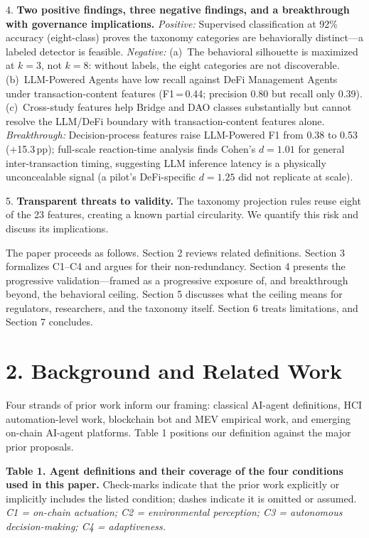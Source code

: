 \documentclass[sigconf,nonacm=false]{acmart}
\begin{document}
4. \textbf{Two positive findings, three negative findings, and a breakthrough with governance implications.} \textit{Positive:} Supervised classification at 92\% accuracy (eight-class) proves the taxonomy categories are behaviorally distinct---a labeled detector is feasible. \textit{Negative:} (a)~The behavioral silhouette is maximized at $k{=}3$, not $k{=}8$: without labels, the eight categories are not discoverable. (b)~LLM-Powered Agents have low recall against DeFi Management Agents under transaction-content features (F1\,=\,0.44; precision 0.80 but recall only 0.39). (c)~Cross-study features help Bridge and DAO classes substantially but cannot resolve the LLM/DeFi boundary with transaction-content features alone. \textit{Breakthrough:} Decision-process features raise LLM-Powered F1 from 0.38 to 0.53 ($+$15.3\,pp); full-scale reaction-time analysis finds Cohen's $d{=}1.01$ for general inter-transaction timing, suggesting LLM inference latency is a physically unconcealable signal (a pilot's DeFi-specific $d{=}1.25$ did not replicate at scale).

5. \textbf{Transparent threats to validity.} The taxonomy projection rules reuse eight of the 23 features, creating a known partial circularity. We quantify this risk and discuss its implications.

The paper proceeds as follows. Section 2 reviews related definitions. Section 3 formalizes C1--C4 and argues for their non-redundancy. Section 4 presents the progressive validation---framed as a progressive exposure of, and breakthrough beyond, the behavioral ceiling. Section 5 discusses what the ceiling means for regulators, researchers, and the taxonomy itself. Section 6 treats limitations, and Section 7 concludes.


\section{2. Background and Related Work}

Four strands of prior work inform our framing: classical AI-agent definitions, HCI automation-level work, blockchain bot and MEV empirical work, and emerging on-chain AI-agent platforms. Table 1 positions our definition against the major prior proposals.

\textbf{Table 1. Agent definitions and their coverage of the four conditions used in this paper.} Check-marks indicate that the prior work explicitly or implicitly includes the listed condition; dashes indicate it is omitted or assumed. \textit{C1 = on-chain actuation; C2 = environmental perception; C3 = autonomous decision-making; C4 = adaptiveness.}
\end{document}

